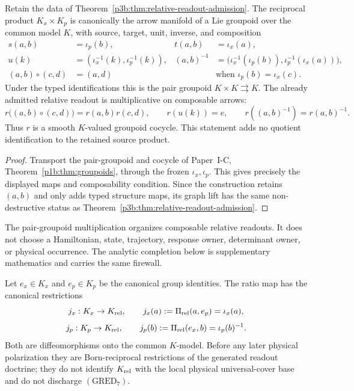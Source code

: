 \documentclass[11pt,a4paper]{article}
\begin{document}
\begin{theorem}
\label{p3b:thm:typed-pair-groupoid-relative-cocycle}
Retain the data of
Theorem~\ref{p3b:thm:relative-readout-admission}.  The reciprocal product
\(K_x\times K_p\) is canonically the arrow manifold of a Lie groupoid over
the common model \(K\), with source, target, unit, inverse, and composition
\[
 \begin{aligned}
 s(a,b)&=\iota_p(b),
 &t(a,b)&=\iota_x(a),\\
 u(k)&=(\iota_x^{-1}(k),\iota_p^{-1}(k)),
 &(a,b)^{-1}&=
 \bigl(\iota_x^{-1}(\iota_p(b)),
       \iota_p^{-1}(\iota_x(a))\bigr),\\
 (a,b)\circ(c,d)&=(a,d)
 &&\text{when }\iota_p(b)=\iota_x(c).
 \end{aligned}
\]
Under the typed identifications this is the pair groupoid \(K\times K
\rightrightarrows K\).  The already admitted relative readout is
multiplicative on composable arrows:
\[
 r\bigl((a,b)\circ(c,d)\bigr)=r(a,b)r(c,d),
 \qquad r(u(k))=e,
 \qquad r((a,b)^{-1})=r(a,b)^{-1}.
\]
Thus \(r\) is a smooth \(K\)-valued groupoid cocycle.  This statement adds
no quotient identification to the retained source product.
\end{theorem}

\begin{proof}
Transport the pair-groupoid and cocycle of Paper~I-C,
Theorem~\ref{p1b:thm:groupoids}, through the frozen
\(\iota_x,\iota_p\).  This gives precisely the displayed maps and
composability condition.  Since the construction retains \((a,b)\) and
only adds typed structure maps, its graph lift has the same non-destructive
status as Theorem~\ref{p3b:thm:relative-readout-admission}.
\end{proof}

\begin{remark}
\label{p3b:rem:pair-groupoid-scope-firewall}
The pair-groupoid multiplication organizes composable relative readouts.  It
does not choose a Hamiltonian, state, trajectory, response owner, determinant
owner, or physical occurrence.  The analytic completion below is
supplementary mathematics and carries the same firewall.
\end{remark}

\begin{corollary}
\label{p3b:cor:canonical-factor-restrictions}
Let \(e_x\in K_x\) and \(e_p\in K_p\) be the canonical group identities.
The ratio map has the canonical restrictions
\[
 j_x:K_x\to K_{\rm rel},\qquad j_x(a):=\Pi_{\rm rel}(a,e_p)=\iota_x(a),
\]
\[
 j_p:K_p\to K_{\rm rel},\qquad j_p(b):=\Pi_{\rm rel}(e_x,b)=\iota_p(b)^{-1}.
\]
Both are diffeomorphisms onto the common \(K\)-model.  Before any later
physical polarization they are Born-reciprocal restrictions of the generated
readout doctrine; they do not identify \(K_{\rm rel}\) with the local
physical universal-cover base and do not discharge \((\mathrm{GRED}_7)\).
\end{corollary}
\end{document}
